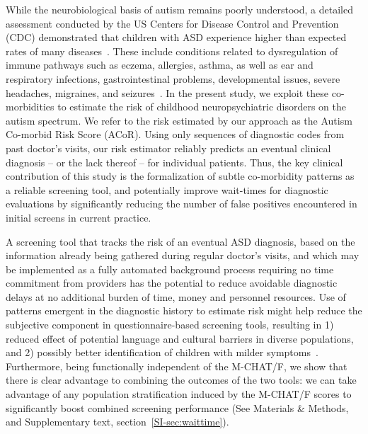 \documentclass[onecolumn,10pt]{IEEEtran}
\def\acor{ACoR\xspace}
\begin{document}
While the neurobiological basis of autism remains poorly understood,  a detailed assessment conducted by the US Centers for Disease Control and Prevention (CDC) demonstrated that  children with ASD experience  higher than expected rates of many diseases~\cite{cdc}. These include conditions related to dysregulation of immune pathways such as eczema, allergies, asthma, as well as ear and respiratory infections, gastrointestinal problems, developmental issues, severe headaches, migraines, and seizures~\cite{pmid30733689,pmid22511918}. In the present study, we exploit   these   co-morbidities to estimate the risk of  childhood neuropsychiatric disorders on the autism spectrum. We refer to the risk estimated by our approach as the Autism Co-morbid Risk Score (\acor). Using only sequences of diagnostic codes from past doctor's visits, our risk estimator reliably
predicts an eventual clinical  diagnosis -- or the lack thereof -- for individual patients.
Thus, the key clinical  contribution of this study is the formalization  of subtle co-morbidity patterns as a reliable screening tool, and potentially  improve wait-times for diagnostic evaluations by significantly reducing the number of false positives encountered in initial screens in current practice.
 
 
A  screening  tool that tracks the risk of an eventual ASD diagnosis,  based  on the information already being gathered during regular doctor's visits, and which may be implemented as a  fully automated background process requiring no time commitment from providers has the potential to reduce avoidable diagnostic  delays at no additional burden of time, money and personnel resources.  Use of patterns emergent in  the diagnostic history to estimate risk might help reduce the subjective component in questionnaire-based screening tools, resulting in 1) reduced effect of potential language and cultural barriers in diverse populations, and 2) possibly better identification of  children with milder symptoms~\cite{hyman2020identification}.
Furthermore, being functionally independent of the M-CHAT/F, we show that there is clear advantage to combining the outcomes of the two tools: we can take advantage of any population stratification induced by the M-CHAT/F scores to significantly boost combined screening performance (See Materials \&  Methods, and Supplementary text, section~\ref{SI-sec:waittime}).
 
\end{document}
